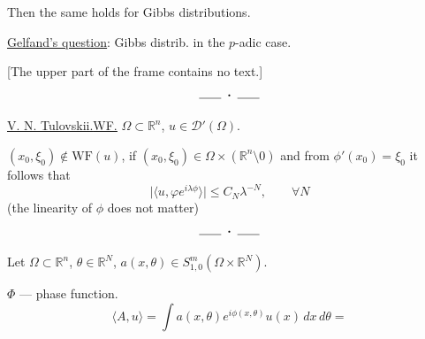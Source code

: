 Then the same holds for Gibbs distributions.

\underline{\underline{Gelfand's question}}: Gibbs distrib. in the \(p\)-adic case.


[The upper part of the frame contains no text.]
\[
\rule{1.8em}{.4pt}\;\boldsymbol{\cdot}\;\rule{1.8em}{.4pt}
\]
\qquad {}

\underline{\underline{V. N. Tulovskii.}}\quad \underline{\underline{WF.}}\quad
\(\Omega\subset\mathbb R^n\), \(u\in\mathcal D'(\Omega)\).

\((x_0,\xi_0)\notin\mathrm{WF}(u)\), if
\((x_0,\xi_0)\in\Omega\times(\mathbb R^n\setminus0)\) and
from \(\phi'(x_0)=\xi_0\) it follows that
\[
\bigl|\langle u,\varphi e^{i\lambda\phi}\rangle\bigr|
\le C_N\lambda^{-N},\qquad\forall N
\]
(the linearity of \(\phi\) does not matter)
\[
\rule{1.8em}{.4pt}\;\boldsymbol{\cdot}\;\rule{1.8em}{.4pt}
\]

Let \(\Omega\subset\mathbb R^n\), \(\theta\in\mathbb R^N\),
\(a(x,\theta)\in S^m_{1,0}(\Omega\times\mathbb R^N)\).

\(\Phi\) — phase function.
\[
\langle A,u\rangle=\int a(x,\theta)e^{i\phi(x,\theta)}u(x)\,dx\,d\theta=
\]


